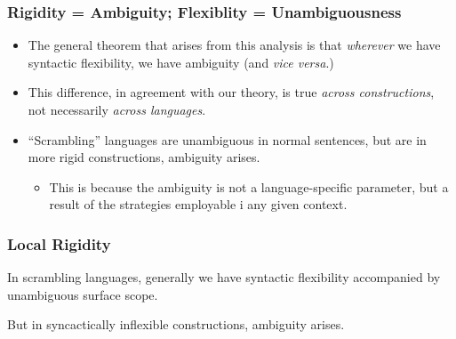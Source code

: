 \documentclass[aspectratio=1610]{beamer}
\begin{document}
\begin{frame}
	\frametitle{Rigidity = Ambiguity; Flexiblity = Unambiguousness}

	\begin{itemize}
		\item The general theorem that arises from this analysis is that \emph{wherever} we have syntactic flexibility, we have ambiguity (and \textit{vice versa}.)
		\item This difference, in agreement with our theory, is true \emph{across constructions}, not necessarily \emph{across languages}.
		\item ``Scrambling'' languages are unambiguous in normal sentences, but are in more rigid constructions, ambiguity arises.
			\begin{itemize}
				\item This is because the ambiguity is not a language-specific parameter, but a result of the strategies employable i any given context.
			\end{itemize}
	\end{itemize}

\end{frame}

\begin{frame}
	\frametitle{Local Rigidity}\pause
	In scrambling languages, generally we have syntactic flexibility accompanied by unambiguous surface scope.\pause
	
\begin{exe}
\ex \begin{xlist}\label{chin}
\end{xlist}
\end{exe}\pause

But in syncactically inflexible constructions, ambiguity arises.\pause

\begin{exe}
\end{exe}
\end{frame}
\end{document}
